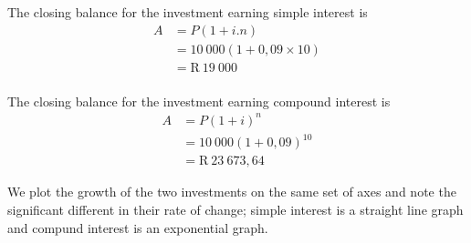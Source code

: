 The closing balance for the investment earning simple interest is
\begin{align*}
    A &= P(1 + i . n)\\
      &= 10~000(1 + 0,09 \times 10)\\
      &= \mbox{R}~19~000\\
\end{align*}

The closing balance for the investment earning compound interest is
\begin{align*}
    A &= P(1 + i)^n\\
      &= 10~000(1 + 0,09)^{10}\\
      &= \mbox{R}~23~673,64
\end{align*}

We plot the growth of the two investments on the same set of axes and note the significant different in their rate of change; simple interest is a straight line graph and compund interest is an exponential graph.

\begin{figure}[H]
    \begin{center}
      \\
	\label{FG:fig:SI10}
    \end{center}
\end{figure}


